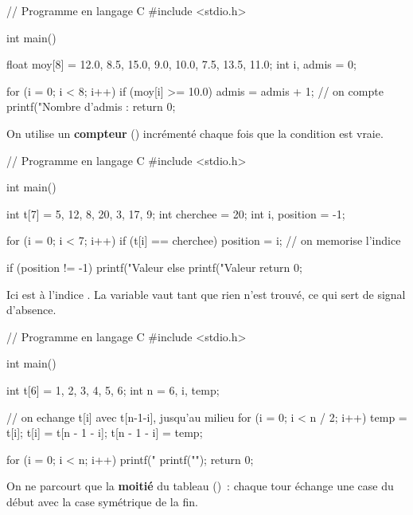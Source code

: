 \begin{codec}
// Programme en langage C
#include <stdio.h>

int main() {
    float moy[8] = {12.0, 8.5, 15.0, 9.0, 10.0, 7.5, 13.5, 11.0};
    int i, admis = 0;

    for (i = 0; i < 8; i++) {
        if (moy[i] >= 10.0) {
            admis = admis + 1;      // on compte
        }
    }
    printf("Nombre d'admis : %
    return 0;
}
\end{codec}
On utilise un \textbf{compteur} () incrémenté chaque fois que la
condition  est vraie.

\begin{codec}
// Programme en langage C
#include <stdio.h>

int main() {
    int t[7] = {5, 12, 8, 20, 3, 17, 9};
    int cherchee = 20;
    int i, position = -1;

    for (i = 0; i < 7; i++) {
        if (t[i] == cherchee) {
            position = i;       // on memorise l'indice
        }
    }

    if (position != -1) {
        printf("Valeur %
    } else {
        printf("Valeur %
    }
    return 0;
}
\end{codec}
Ici  est à l'indice . La variable  vaut 
tant que rien n'est trouvé, ce qui sert de signal d'absence.

\begin{codec}
// Programme en langage C
#include <stdio.h>

int main() {
    int t[6] = {1, 2, 3, 4, 5, 6};
    int n = 6, i, temp;

    // on echange t[i] avec t[n-1-i], jusqu'au milieu
    for (i = 0; i < n / 2; i++) {
        temp = t[i];
        t[i] = t[n - 1 - i];
        t[n - 1 - i] = temp;
    }

    for (i = 0; i < n; i++) {
        printf("%
    }
    printf("\n");
    return 0;
}
\end{codec}
On ne parcourt que la \textbf{moitié} du tableau ()~: chaque tour
échange une case du début avec la case symétrique de la fin.


